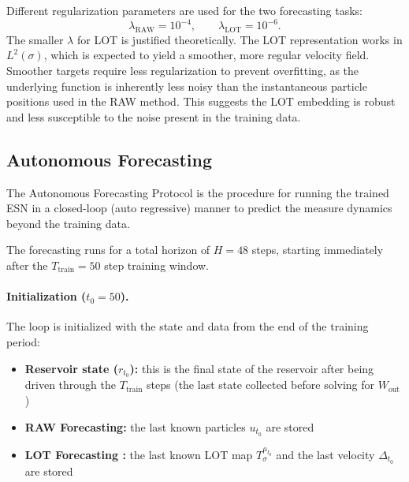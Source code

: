 \documentclass[11pt]{article}
\newcommand{\1}{\mathbf{1}}
\begin{document}
Different regularization parameters are used for the two forecasting tasks:
\[
\lambda_{\text{RAW}} = 10^{-4}, 
\qquad 
\lambda_{\text{LOT}} = 10^{-6}.
\]
The smaller $\lambda$ for LOT is justified theoretically. The LOT representation works in $L^2(\sigma)$, which is expected to yield a smoother, more regular velocity field. Smoother targets require less regularization to prevent overfitting, as the underlying function is inherently less noisy than the instantaneous particle positions used in the RAW method. This suggests the LOT embedding is robust and less susceptible to the noise present in the training data.

\subsection{Autonomous Forecasting}\label{sec:forecast-protocol}

The Autonomous Forecasting Protocol is the procedure for running the trained ESN in a closed-loop (auto regressive) manner to predict the measure dynamics beyond the training data.

The forecasting runs for a total horizon of $H = 48$ steps, starting immediately after the $T_{\text{train}}=50$ step training window.

\paragraph{Initialization ($t_0 = 50$).} The loop is initialized with the state and data from the end of the training period:
\begin{itemize}
\item \textbf{Reservoir state ($r_{t_0}$):} this is the final state of the reservoir after being driven through the $T_{\text{train}}$ steps (the last state collected before solving for $W_{\text{out}}$)

\item \textbf{RAW Forecasting:} the last known particles $u_{t_0}$ are stored

\item \textbf{LOT Forecasting :} the last known LOT map $T_\sigma^{\mu_{t_0}}$ and the last velocity $\Delta_{t_0}$ are stored
\end{itemize}
\end{document}

